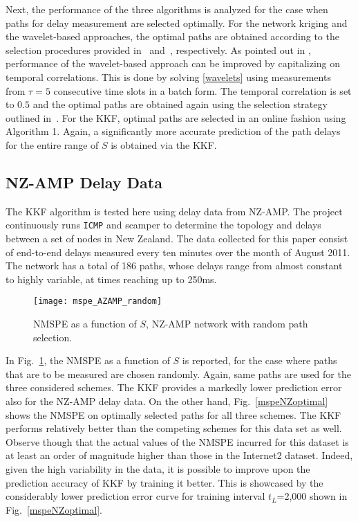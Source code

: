 \documentclass[draftcls,onecolumn,12pt]{IEEEtran}
\newlength \figwidth
\theoremstyle{plain}\newtheorem{thm}{Theorem}
\theoremstyle{definition}
\theoremstyle{remark}
\begin{document}
Next, the performance of the three algorithms is analyzed for the case when paths for delay measurement are selected optimally. 
For the network kriging and the wavelet-based approaches, the optimal paths are obtained according to the selection procedures provided in~\cite{nk} and~\cite{coates}, respectively. 
As pointed out in \cite{coates}, performance of the wavelet-based approach can be improved by capitalizing on temporal correlations.
This is done by solving \eqref{wavelets} using measurements from $\tau = 5$ consecutive time slots in a batch form. 
The temporal correlation is set to $0.5$ and the optimal paths are obtained again using the selection strategy outlined in~\cite{coates}. 
For the KKF, optimal paths are selected in an online fashion using Algorithm 1.
Again, a significantly more accurate prediction of the path delays for the entire range of $S$ is obtained via the KKF.

   
 
 
\subsection{NZ-AMP Delay Data}
The KKF algorithm is tested here using delay data from NZ-AMP. 
The project continuously runs \texttt{ICMP} and scamper to determine the topology and delays between a set of nodes in New Zealand. The data collected for this paper consist of end-to-end delays measured every ten minutes over the month of August 2011. The network has a total of 186 paths, whose delays range from almost constant to highly variable, at times reaching up to 250ms.

\begin{figure}
\centering
\texttt{[image: mspe\_AZAMP\_random]}
\caption{NMSPE as a function of $S$, NZ-AMP network with random path selection.}
\label{mspeNZrandom}
\end{figure}




In Fig.~\ref{mspeNZrandom}, the NMSPE as a function of $S$ is reported, for the case where paths that are to be measured are chosen randomly. Again, same paths are used for the three considered  schemes. The KKF provides a markedly lower prediction error also for the NZ-AMP delay data. 
On the other hand, Fig.~\ref{mspeNZoptimal} shows the NMSPE on optimally selected paths for all three schemes. 
The KKF performs relatively better than the competing schemes for this data set as well.
Observe though that the actual values of the NMSPE incurred for this dataset is at least an order of magnitude higher than those in the Internet2 dataset. 
Indeed, given the high variability in the data, it is possible to improve upon the prediction accuracy of KKF by training it better. 
This is showcased by the considerably lower prediction error curve for training interval $t_L$=2,000 shown in Fig.~\ref{mspeNZoptimal}.
\end{document}
